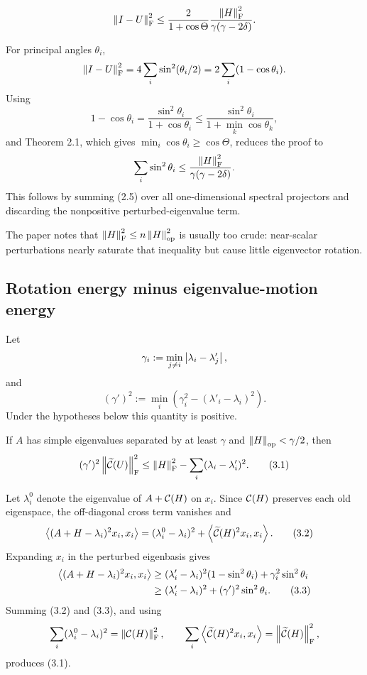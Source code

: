 \begin{theorem}[Davis 3.1]
\[
  \left\lVert I-U\right\rVert_{\mathrm{F}}^2
  \le
  \frac{2}{1+\cos\Theta}
  \frac{\left\lVert H\right\rVert_{\mathrm{F}}^2}{\gamma(\gamma-2\delta)}.
\]
\end{theorem}
For principal angles $\theta_i$,
\[
  \left\lVert I-U\right\rVert_{\mathrm{F}}^2
  =4\sum_i\sin^2(\theta_i/2)
  =2\sum_i(1-\cos\theta_i).
\]
Using
\[
  1-\cos\theta_i
  =\frac{\sin^2\theta_i}{1+\cos\theta_i}
  \le\frac{\sin^2\theta_i}{1+\min_k\cos\theta_k},
\]
and Theorem 2.1, which gives $\min_i\cos\theta_i\ge\cos\Theta$, reduces the proof to
\[
  \sum_i\sin^2\theta_i
  \le\frac{\left\lVert H\right\rVert_{\mathrm{F}}^2}{\gamma(\gamma-2\delta)}.
\]
This follows by summing (2.5) over all one-dimensional spectral projectors and discarding the nonpositive perturbed-eigenvalue term.

The paper notes that $\left\lVert H\right\rVert_{\mathrm{F}}^2\le n\left\lVert H\right\rVert_{\mathrm{op}}^2$ is usually too crude: near-scalar perturbations nearly saturate that inequality but cause little eigenvector rotation.

\subsection{Rotation energy minus eigenvalue-motion energy}

Let
\[
  \gamma_i:=\min_{j\ne i}\left\lvert \lambda_i-\lambda'_j\right\rvert,
\]
and
\[
  (\gamma')^2
  :=\min_i\left(\gamma_i^2-(\lambda'_i-\lambda_i)^2\right).
\]
Under the hypotheses below this quantity is positive.

\begin{theorem}[Davis 3.2]
If $A$ has simple eigenvalues separated by at least $\gamma$ and $\left\lVert H\right\rVert_{\mathrm{op}}<\gamma/2$, then
\begin{equation}
  (\gamma')^2\left\lVert \widetilde{\mathcal{C}}(U)\right\rVert_{\mathrm{F}}^2
  \le
  \left\lVert H\right\rVert_{\mathrm{F}}^2-
  \sum_i(\lambda_i-\lambda'_i)^2. \tag{3.1}
\end{equation}
\end{theorem}

Let $\lambda_i^0$ denote the eigenvalue of $A+\mathcal{C}(H)$ on $x_i$. Since $\mathcal{C}(H)$ preserves each old eigenspace, the off-diagonal cross term vanishes and
\begin{align}
  \left\langle (A+H-\lambda_i)^2x_i,x_i\right\rangle
  &=(\lambda_i^0-\lambda_i)^2
    +\left\langle \widetilde{\mathcal{C}}(H)^2x_i,x_i\right\rangle. \tag{3.2}
\end{align}
Expanding $x_i$ in the perturbed eigenbasis gives
\begin{align}
  \left\langle (A+H-\lambda_i)^2x_i,x_i\right\rangle
  &\ge
  (\lambda'_i-\lambda_i)^2(1-\sin^2\theta_i)
  +\gamma_i^2\sin^2\theta_i\notag\\
  &\ge
  (\lambda'_i-\lambda_i)^2
  +(\gamma')^2\sin^2\theta_i. \tag{3.3}
\end{align}
Summing (3.2) and (3.3), and using
\[
  \sum_i(\lambda_i^0-\lambda_i)^2=\left\lVert \mathcal{C}(H)\right\rVert_{\mathrm{F}}^2,
  \qquad
  \sum_i\left\langle \widetilde{\mathcal{C}}(H)^2x_i,x_i\right\rangle=\left\lVert \widetilde{\mathcal{C}}(H)\right\rVert_{\mathrm{F}}^2,
\]
produces (3.1).

